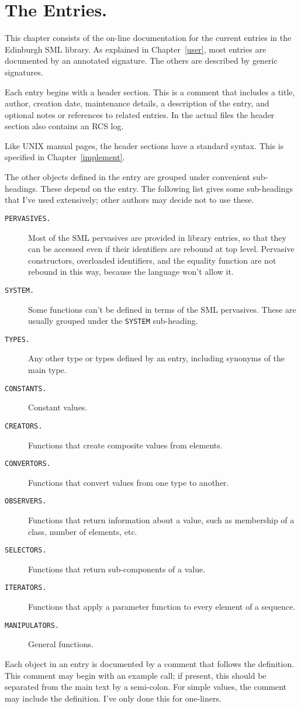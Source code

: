 %
%

\chapter{The Entries.}		\label{entries}

This chapter consists of the on-line documentation for the current entries in
the Edinburgh SML library.  As explained in Chapter~\ref{user},
most entries are documented by an annotated signature.  The others
are described by generic signatures.

Each entry begins with a header section.  This is a comment that
includes a title, author, creation date, maintenance details, a
description of the entry, and optional notes or references to related
entries.  In the actual files the header section also contains an
RCS log.

Like {\small UNIX} manual pages, the header sections have a standard
syntax.  This is specified in Chapter~\ref{implement}.


The other objects defined in the entry are grouped under convenient
sub-headings.  These depend on the entry.  The following list gives
some sub-headings that I've used extensively; other authors may decide
not to use these.

\begin{description}
  \item[{\small\tt PERVASIVES.}]
	Most of the {\small SML} pervasives are provided in library
	entries, so that they can be accessed even if their identifiers are
	rebound at top level.  Pervasive constructors, overloaded
	identifiers, and the equality function are not rebound in this
	way, because the language won't allow it.
  \item[{\small\tt SYSTEM.}]
	Some functions can't be defined in terms of the {\small SML}
	pervasives.  These are usually grouped under the {\small\tt SYSTEM}
	sub-heading.
  \item[{\small\tt TYPES.}]
	Any other type or types defined by an entry, including synonyms
	of the main type.
  \item[{\small\tt CONSTANTS.}]
	Constant values.
  \item[{\small\tt CREATORS.}]
	Functions that create composite values from elements.
  \item[{\small\tt CONVERTORS.}]
	Functions that convert values from one type to another.
  \item[{\small\tt OBSERVERS.}]
	Functions that return information about a value, such as membership
	of a class, number of elements, etc.
  \item[{\small\tt SELECTORS.}]
	Functions that return sub-components of a value.
  \item[{\small\tt ITERATORS.}]
	Functions that apply a parameter function to every element
	of a sequence.
  \item[{\small\tt MANIPULATORS.}]
	General functions.
\end{description}

Each object in an entry is documented by a comment that follows the
definition.  This comment may begin with an example call; if present,
this should be separated from the main text by a semi-colon.  For
simple values, the comment may include the definition.  I've only done
this for one-liners.


